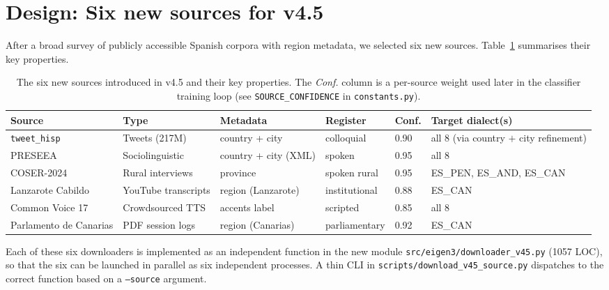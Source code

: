 \documentclass[11pt,a4paper]{article}
\begin{document}
\section{Design: Six new sources for v4.5}

After a broad survey of publicly accessible Spanish corpora with region
metadata, we selected six new sources. Table~\ref{tab:source-design}
summarises their key properties.

\begin{table}[h]
\centering\small
\begin{tabularx}{\linewidth}{l l l l l X}
\toprule
\textbf{Source} & \textbf{Type} & \textbf{Metadata} & \textbf{Register} & \textbf{Conf.} & \textbf{Target dialect(s)} \\
\midrule
\texttt{tweet\_hisp}         & Tweets (217M)        & country + city            & colloquial   & 0.90 & all 8 (via country $+$ city refinement) \\
PRESEEA                      & Sociolinguistic      & country + city (XML)      & spoken       & 0.95 & all 8 \\
COSER-2024                   & Rural interviews     & province                  & spoken rural & 0.95 & ES\_PEN, ES\_AND, ES\_CAN \\
Lanzarote Cabildo            & YouTube transcripts  & region (Lanzarote)        & institutional & 0.88 & ES\_CAN \\
Common Voice 17              & Crowdsourced TTS     & accents label             & scripted     & 0.85 & all 8 \\
Parlamento de Canarias       & PDF session logs     & region (Canarias)         & parliamentary & 0.92 & ES\_CAN \\
\bottomrule
\end{tabularx}
\caption{The six new sources introduced in v4.5 and their key properties.
The \emph{Conf.} column is a per-source weight used later in the
classifier training loop (see
\texttt{SOURCE\_CONFIDENCE} in \texttt{constants.py}).}
\label{tab:source-design}
\end{table}

Each of these six downloaders is implemented as an independent function
in the new module \texttt{src/eigen3/downloader\_v45.py} (1057 LOC), so
that the six can be launched in parallel as six independent processes.
A thin CLI in \texttt{scripts/download\_v45\_source.py} dispatches to
the correct function based on a \texttt{--source} argument.
\end{document}
